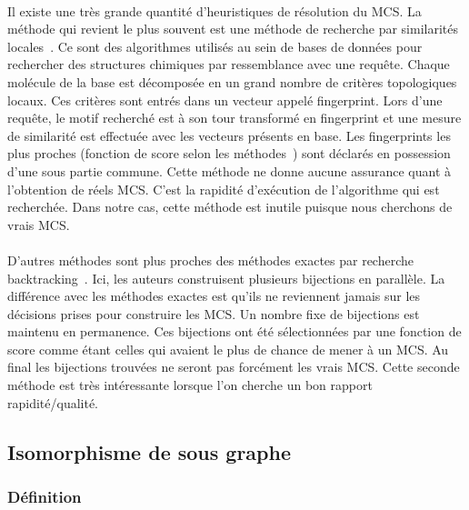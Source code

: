 \documentclass[12pt,french,twoside]{report}
\begin{document}
\paragraph{}Il existe une très grande quantité d'heuristiques de résolution du MCS.
La méthode qui revient le plus souvent est une méthode de recherche par similarités locales~\cite{yan_substructure_2005,willett_similarity_2011}.
Ce sont des algorithmes utilisés au sein de bases de données pour rechercher des structures chimiques par ressemblance avec une requête.
Chaque molécule de la base est décomposée en un grand nombre de critères topologiques locaux.
Ces critères sont entrés dans un vecteur appelé fingerprint.
Lors d'une requête, le motif recherché est à son tour transformé en fingerprint et une mesure de similarité est effectuée avec les vecteurs présents en base.
Les fingerprints les plus proches (fonction de score selon les méthodes~\cite{maggiora_molecular_2011,ndiaye_cp_2011}) sont déclarés en possession d'une sous partie commune.
Cette méthode ne donne aucune assurance quant à l'obtention de réels MCS.
C'est la rapidité d'exécution de l'algorithme qui est recherchée.
Dans notre cas, cette méthode est inutile puisque nous cherchons de vrais MCS.

\paragraph{}D'autres méthodes sont plus proches des méthodes exactes par recherche backtracking~\cite{grosso_simple_2008, wang_fmcsr:_2013}.
Ici, les auteurs construisent plusieurs bijections en parallèle.
La différence avec les méthodes exactes est qu'ils ne reviennent jamais sur les décisions prises pour construire les MCS.
Un nombre fixe de bijections est maintenu en permanence.
Ces bijections ont été sélectionnées par une fonction de score comme étant celles qui avaient le plus de chance de mener à un MCS.
Au final les bijections trouvées ne seront pas forcément les vrais MCS.
Cette seconde méthode est très intéressante lorsque l'on cherche un bon rapport rapidité/qualité.


\subsection{Isomorphisme de sous graphe}

\subsubsection{Définition}
\end{document}
